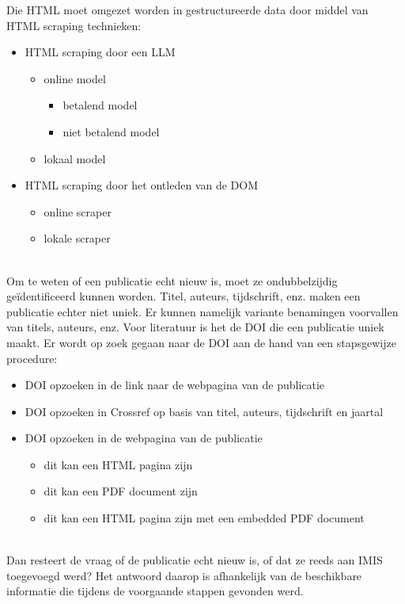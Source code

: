 Die HTML moet omgezet worden in gestructureerde data door middel van HTML scraping technieken:
\begin{itemize}
    \item HTML scraping door een LLM
    \begin{itemize}
        \item online model
        \begin{itemize}
            \item betalend model
            \item niet betalend model
        \end{itemize}
        \item lokaal model
    \end{itemize}
    \item HTML scraping door het ontleden van de DOM
    \begin{itemize}
        \item online scraper
        \item lokale scraper
    \end{itemize}
\end{itemize}\\
Om te weten of een publicatie echt nieuw is, moet ze ondubbelzijdig geïdentificeerd kunnen worden. Titel, auteurs, tijdschrift, enz. maken een publicatie echter niet uniek. Er kunnen namelijk variante benamingen voorvallen van titels, auteurs, enz. Voor literatuur is het de DOI die een publicatie uniek maakt. Er wordt op zoek gegaan naar de DOI aan de hand van een stapsgewijze procedure:
\begin{itemize}
    \item DOI opzoeken in de link naar de webpagina van de publicatie
    \item DOI opzoeken in Crossref op basis van titel, auteurs, tijdschrift en jaartal
    \item DOI opzoeken in de webpagina van de publicatie
    \begin{itemize}
        \item dit kan een HTML pagina zijn
        \item dit kan een PDF document zijn
        \item dit kan een HTML pagina zijn met een embedded PDF document
    \end{itemize}
\end{itemize}\\
Dan resteert de vraag of de publicatie echt nieuw is, of dat ze reeds aan IMIS toegevoegd werd? Het antwoord daarop is afhankelijk van de beschikbare informatie die tijdens de voorgaande stappen gevonden werd.
